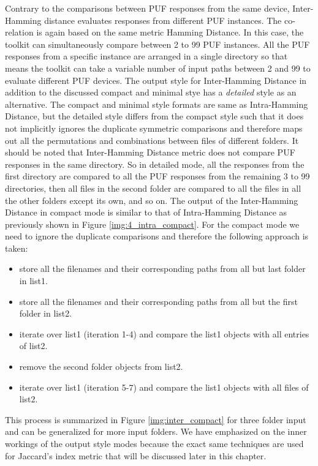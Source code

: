 Contrary to the comparisons between PUF responses from the same device, Inter-Hamming distance evaluates responses from different PUF instances. The co-relation is again based on the same metric Hamming Distance. In this case, the toolkit can simultaneously compare between 2 to 99 PUF instances. All the PUF responses from a specific instance are arranged in a single directory so that means the toolkit can take a variable number of input paths between 2 and 99 to evaluate different PUF devices. The output
style for Inter-Hamming Distance in addition to the discussed compact and minimal stye has a \emph{detailed} style as an alternative. The compact and minimal style formats are same as Intra-Hamming Distance, but the detailed style differs from the compact style such that it does not implicitly ignores the duplicate symmetric comparisons and therefore maps out all the permutations and combinations between files of different folders. It should be noted that Inter-Hamming Distance metric does not compare PUF responses in the same directory. So
in detailed mode, all the responses from the first directory are compared to all the PUF responses from the remaining 3 to 99 directories, then all files in the second folder are compared to all the files in all the other folders except its own, and so on. The output of the Inter-Hamming Distance in compact mode is similar to that of Intra-Hamming Distance as previously shown in Figure \ref{img:4_intra_compact}. For the compact mode we need to ignore the duplicate comparisons and therefore the following approach is
taken:

\begin{itemize}
	\item store all the filenames and their corresponding paths from all but last folder in list1.
	\item store all the filenames and their corresponding paths from all but the first folder in list2.
	\item iterate over list1 (iteration 1-4) and compare the list1 objects with all entries of list2.
	\item remove the second folder objects from list2.
	\item iterate over list1 (iteration 5-7) and compare the list1 objects with all files of list2.
\end{itemize}

This process is summarized in Figure \ref{img:inter_compact} for three folder input and can be generalized for more input folders. We have emphasized on the inner workings of the output style modes because the exact same techniques are used for Jaccard's index metric that will be discussed later in this chapter.\\

